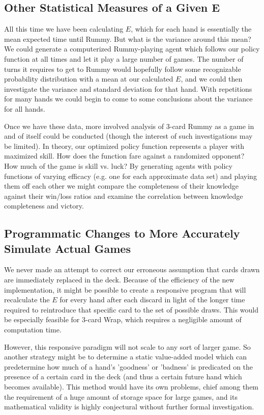 \documentclass[letter,12pt]{article}
\begin{document}
\subsection{Other Statistical Measures of a Given E}

All this time we have been calculating $E$, which for each hand is essentially the mean expected time until Rummy. But what is the variance around this mean? We could generate a computerized Rummy-playing agent which follows our policy function at all times and let it play a large number of games. The number of turns it requires to get to Rummy would hopefully follow some recognizable probability distribution with a mean at our calculated $E$, and we could then investigate the variance and standard deviation for that hand. With repetitions for many hands we could begin to come to some conclusions about the variance for all hands.

Once we have these data, more involved analysis of 3-card Rummy as a game in and of itself could be conducted (though the interest of such investigations may be limited). In theory, our optimized policy function represents a player with maximized skill. How does the function fare against a randomized opponent?   How much of the game is skill vs. luck? By generating agents with policy functions of varying efficacy (e.g. one for each approximate data set) and playing them off each other we might compare the completeness of their knowledge against their win/loss ratios and examine the correlation between knowledge completeness and victory.

\subsection{Programmatic Changes to More Accurately Simulate Actual Games}

We never made an attempt to correct our erroneous assumption that cards drawn are immediately replaced in the deck. Because of the efficiency of the new implementation, it might be possible to create a responsive program that will recalculate the $E$ for every hand after each discard in light of the longer time required to reintroduce that specific card to the set of possible draws. This would be especially feasible for 3-card Wrap, which requires a negligible amount of computation time.

However, this responsive paradigm will not scale to any sort of larger game. So another strategy might be to determine a static value-added model which can predetermine how much of a hand's 'goodness' or 'badness' is predicated on the presence of a certain card in the deck (and thus a certain future hand which becomes available). This method would have its own problems, chief among them the requirement of a huge amount of storage space for large games, and its mathematical validity is highly conjectural without further formal investigation.
\end{document}
